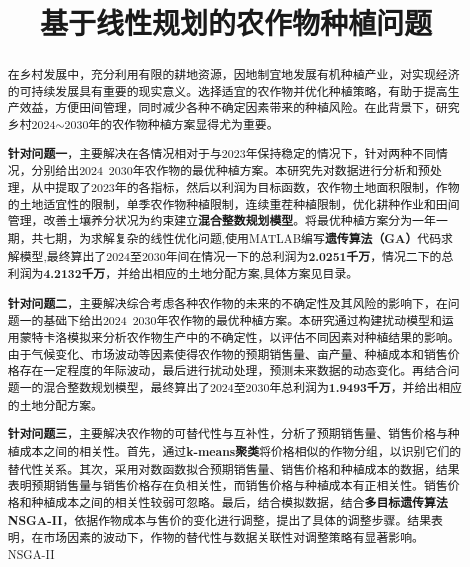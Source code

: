 \documentclass[withoutpreface,bwprint]{cumcmthesis} %
\title{基于线性规划的农作物种植问题}
\begin{document}
 \maketitle
 \begin{abstract}
 	
 	在乡村发展中，充分利用有限的耕地资源，因地制宜地发展有机种植产业，对实现经济的可持续发展具有重要的现实意义。选择适宜的农作物并优化种植策略，有助于提高生产效益，方便田间管理，同时减少各种不确定因素带来的种植风险。在此背景下，研究乡村2024$\sim$2030年的农作物种植方案显得尤为重要。
 	
	\textbf{针对问题一}，主要解决在各情况相对于与2023年保持稳定的情况下，针对两种不同情况，分别给出2024~2030年农作物的最优种植方案。本研究先对数据进行分析和预处理，从中提取了2023年的各指标，然后以利润为目标函数，农作物土地面积限制，作物的土地适宜性的限制，单季农作物种植限制，连续重茬种植限制，优化耕种作业和田间管理，改善土壤养分状况为约束建立\textbf{混合整数规划模型}。将最优种植方案分为一年一期，共七期，为求解复杂的线性优化问题,使用MATLAB编写\textbf{遗传算法（GA）}代码求解模型,最终算出了2024至2030年间在情况一下的总利润为\textbf{2.0251千万}，情况二下的总利润为\textbf{4.2132千万}，并给出相应的土地分配方案,具体方案见目录。
	
	\textbf{针对问题二}，主要解决综合考虑各种农作物的未来的不确定性及其风险的影响下，在问题一的基础下给出2024~2030年农作物的最优种植方案。本研究通过构建扰动模型和运用蒙特卡洛模拟来分析农作物生产中的不确定性，以评估不同因素对种植结果的影响。由于气候变化、市场波动等因素使得农作物的预期销售量、亩产量、种植成本和销售价格存在一定程度的年际波动，最后进行扰动处理，预测未来数据的动态变化。再结合问题一的混合整数规划模型，最终算出了2024至2030年总利润为\textbf{1.9493千万}，并给出相应的土地分配方案。
	
	\textbf{针对问题三}，主要解决农作物的可替代性与互补性，分析了预期销售量、销售价格与种植成本之间的相关性。首先，通过\textbf{k-means聚类}将价格相似的作物分组，以识别它们的替代性关系。其次，采用对数函数拟合预期销售量、销售价格和种植成本的数据，结果表明预期销售量与销售价格存在负相关性，而销售价格与种植成本有正相关性。销售价格和种植成本之间的相关性较弱可忽略。最后，结合模拟数据，结合\textbf{多目标遗传算法}
\textbf{	NSGA-II}，依据作物成本与售价的变化进行调整，提出了具体的调整步骤。结果表明，在市场因素的波动下，作物的替代性与数据关联性对调整策略有显著影响。
\quad NSGA-II
\end{abstract}


\end{document}
